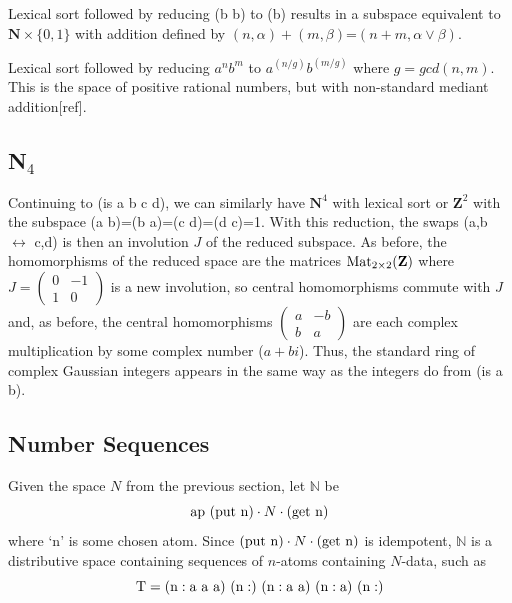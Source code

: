 \documentclass[11pt]{article}
\begin{document}
\begin{itemize}
{\item{Lexical sort followed by reducing (b b) to (b) results in a subspace equivalent to $\mathbf N\times\{0,1\}$ with addition
defined by $(n,\alpha)+(m,\beta)$=$(n+m,\alpha\vee\beta)$.}

\item{Lexical sort followed by reducing $a^n b^m$ to $a^{(n/g)} b^{(m/g)}$ where $g=gcd(n,m)$.  This is the space of positive 
rational numbers, but with non-standard mediant addition[ref].}

} 
\end{itemize}

\subsection{N$_4$} 

    Continuing to (is a b c d), we can similarly have $\mathbf N^4$ with lexical sort or $\mathbf Z^2$ with the subspace
(a b)=(b a)=(c d)=(d c)=1.  With this reduction, the swaps (a,b $\leftrightarrow$ c,d) is then an involution $J$ of the reduced subspace.  
As before, the homomorphisms of the reduced space are the matrices ${\rm Mat}_{2\times2}(\mathbf Z)$ where 
$
J=
\left (
\begin{array}{cc} 
0 & -1 \\ 1 & 0 
\end{array}
\right ) 
$
is a new involution, so central homomorphisms commute with $J$ and, as before, the central homomorphisms 
$
\left (
\begin{array}{cc} 
a & -b \\ b & a 
\end{array}
\right ) 
$
are each complex multiplication by some complex number ($a+b i$).  Thus, the standard ring of complex Gaussian integers appears 
in the same way as the integers do from (is a b). 

\subsection{Number Sequences}

      Given the space $N$ from the previous section, let $\mathbb{N}$ be 
\begin{equation}
{{\rm ap}\ ({\rm put\ {\rm n}})\cdot N \cdot ({\rm get\ {\rm n}})}
\end{equation}
where `n' is some chosen atom.  Since $({\rm put\ n})\cdot N \cdot ({\rm get\ n})$ is idempotent, ${\mathbb N}$ is a distributive space containing 
sequences of $n$-atoms containing $N$-data, such as 
\begin{equation} 
{\rm T = (n:a\ a\ a)\ (n:)\ (n:a\ a)\ (n:a)\ (n:)}
\end{equation} 
\end{document}
